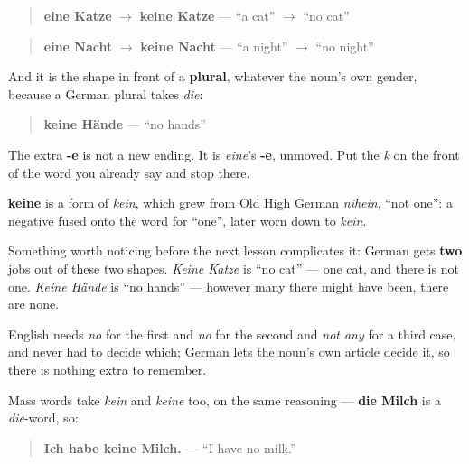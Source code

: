 \begin{quote}
\textbf{eine Katze} $\to$ \textbf{keine Katze} — \textquotedblleft{}a cat\textquotedblright{} $\to$ \textquotedblleft{}no cat\textquotedblright{}
\end{quote}

\begin{quote}
\textbf{eine Nacht} $\to$ \textbf{keine Nacht} — \textquotedblleft{}a night\textquotedblright{} $\to$ \textquotedblleft{}no night\textquotedblright{}
\end{quote}

And it is the shape in front of a \textbf{plural}, whatever the noun's own gender, because a German plural takes \emph{die}:

\begin{quote}
\textbf{keine Hände} — \textquotedblleft{}no hands\textquotedblright{}
\end{quote}

The extra \textbf{-e} is not a new ending. It is \emph{eine}'s \textbf{-e}, unmoved. Put the \emph{k} on the front of the word you already say and stop there.

\begin{cousinweb}
\textbf{keine} is a form of \emph{kein}, which grew from Old High German \emph{nihein}, \textquotedblleft{}not one\textquotedblright{}: a negative fused onto the word for \textquotedblleft{}one\textquotedblright{}, later worn down to \emph{kein}.
\end{cousinweb}

\begin{grammarlens}[title={Grammar Lens: one word cancels the whole family}]
Something worth noticing before the next lesson complicates it: German gets \textbf{two} jobs out of these two shapes. \emph{Keine Katze} is \textquotedblleft{}no cat\textquotedblright{} — one cat, and there is not one. \emph{Keine Hände} is \textquotedblleft{}no hands\textquotedblright{} — however many there might have been, there are none.

English needs \emph{no} for the first and \emph{no} for the second and \emph{not any} for a third case, and never had to decide which; German lets the noun's own article decide it, so there is nothing extra to remember.

Mass words take \emph{kein} and \emph{keine} too, on the same reasoning — \textbf{die Milch} is a \emph{die}-word, so:

\begin{quote}
\textbf{Ich habe keine Milch.} — \textquotedblleft{}I have no milk.\textquotedblright{}
\end{quote}
\end{grammarlens}

